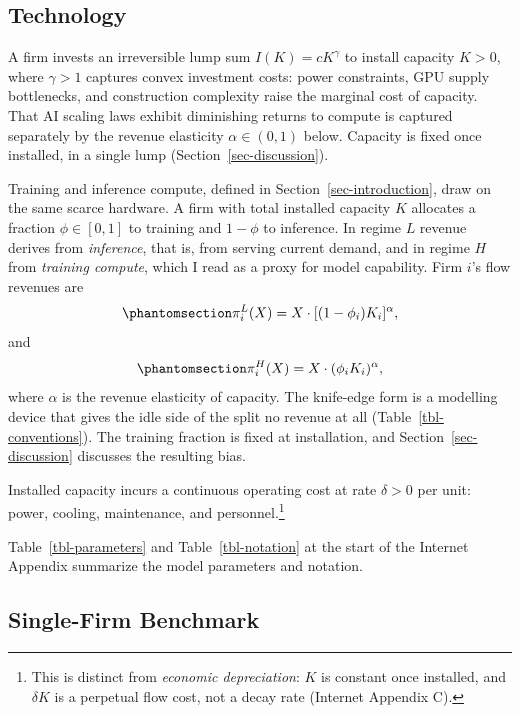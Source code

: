 \documentclass[
  11pt,
  letterpaper,
]{scrartcl}
\begin{document}
\subsection{Technology}\label{technology}

A firm invests an irreversible lump sum \(I(K) = cK^\gamma\) to install
capacity \(K > 0\), where \(\gamma > 1\) captures convex investment
costs: power constraints, GPU supply bottlenecks, and construction
complexity raise the marginal cost of capacity. That AI scaling laws
exhibit diminishing returns to compute
\citep{kaplan2020scaling, hoffmann2022training} is captured separately
by the revenue elasticity \(\alpha \in (0,1)\) below. Capacity is fixed
once installed, in a single lump (Section~\ref{sec-discussion}).

Training and inference compute, defined in
Section~\ref{sec-introduction}, draw on the same scarce hardware. A firm
with total installed capacity \(K\) allocates a fraction
\(\phi \in [0, 1]\) to training and \(1 - \phi\) to inference. In regime
\(L\) revenue derives from \emph{inference}, that is, from serving
current demand, and in regime \(H\) from \emph{training compute}, which
I read as a proxy for model capability. Firm \(i\)'s flow revenues are
\begin{equation}\protect\phantomsection\label{eq-revenue-L}{
\pi_i^L(X) = X \cdot [(1-\phi_i)K_i]^\alpha,
}\end{equation} and
\begin{equation}\protect\phantomsection\label{eq-revenue-H}{
\pi_i^H(X) = X \cdot (\phi_i K_i)^\alpha,
}\end{equation} where \(\alpha\) is the revenue elasticity of capacity.
The knife-edge form is a modelling device that gives the idle side of
the split no revenue at all (Table~\ref{tbl-conventions}). The training
fraction is fixed at installation, and Section~\ref{sec-discussion}
discusses the resulting bias.

Installed capacity incurs a continuous operating cost at rate
\(\delta > 0\) per unit: power, cooling, maintenance, and
personnel.\footnote{This is distinct from \emph{economic depreciation}:
  \(K\) is constant once installed, and \(\delta K\) is a perpetual flow
  cost, not a decay rate (Internet Appendix C).}

Table~\ref{tbl-parameters} and Table~\ref{tbl-notation} at the start of
the Internet Appendix summarize the model parameters and notation.

\subsection{Single-Firm Benchmark}\label{sec-single-firm}
\end{document}
